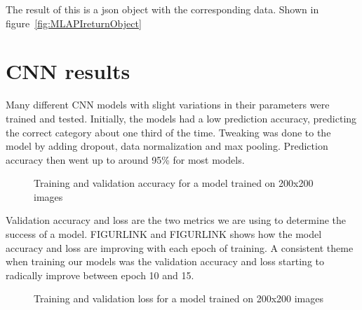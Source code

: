 The result of this is a json object with the corresponding data.
Shown in figure~\ref{fig:MLAPIreturnObject}

\section{CNN results}\label{sec:cnn-results}
Many different CNN models with slight variations in their parameters were trained and tested.
Initially, the models had a low prediction accuracy, predicting the correct category about one third of the time.
Tweaking was done to the model by adding dropout, data normalization and max pooling.
Prediction accuracy then went up to around 95\% for most models.

\begin{figure}[h]
    \caption{Training and validation accuracy for a model trained on 200x200 images}
    \label{fig:200modelaccuracy}
\end{figure}
\clearpage
Validation accuracy and loss are the two metrics we are using to determine the success of a model.
FIGURLINK and FIGURLINK shows how the model accuracy and loss are improving with each epoch of training.
A consistent theme when training our models was the validation accuracy and loss starting to radically improve between epoch 10 and 15.

\begin{figure}[h]
    \caption{Training and validation loss for a model trained on 200x200 images}
    \label{fig:200modelloss}
\end{figure}



